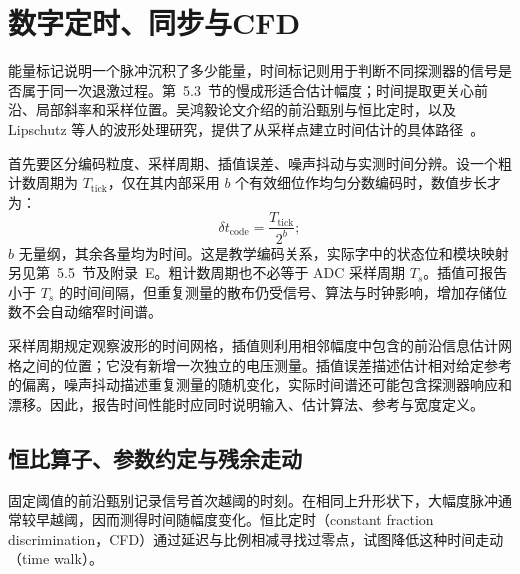 \section{数字定时、同步与CFD}\label{sec:5-4}

能量标记说明一个脉冲沉积了多少能量，时间标记则用于判断不同探测器的信号是否属于同一次退激过程。第~5.3~节的慢成形适合估计幅度；时间提取更关心前沿、局部斜率和采样位置。吴鸿毅论文介绍的前沿甄别与恒比定时，以及 Lipschutz 等人的波形处理研究，提供了从采样点建立时间估计的具体路径~\cite{wu-hongyi-2020-general-purpose-digital-daq-thesis, doctoral-r1-g32-lipschutz-2016-pixie16-ddas-timing}。

首先要区分编码粒度、采样周期、插值误差、噪声抖动与实测时间分辨。设一个粗计数周期为 $T_{\mathrm{tick}}$，仅在其内部采用 $b$ 个有效细位作均匀分数编码时，数值步长才为：
\begin{equation}\label{eq:5-4-code-step}
\delta t_{\mathrm{code}} = \frac{T_{\mathrm{tick}}}{2^b};
\end{equation}
$b$ 无量纲，其余各量均为时间。这是教学编码关系，实际字中的状态位和模块映射另见第~5.5~节及附录~E。粗计数周期也不必等于 ADC 采样周期 $T_s$。插值可报告小于 $T_s$ 的时间间隔，但重复测量的散布仍受信号、算法与时钟影响，增加存储位数不会自动缩窄时间谱。

采样周期规定观察波形的时间网格，插值则利用相邻幅度中包含的前沿信息估计网格之间的位置；它没有新增一次独立的电压测量。插值误差描述估计相对给定参考的偏离，噪声抖动描述重复测量的随机变化，实际时间谱还可能包含探测器响应和漂移。因此，报告时间性能时应同时说明输入、估计算法、参考与宽度定义。

\subsection{恒比算子、参数约定与残余走动}\label{subsec:5-4-1}

固定阈值的前沿甄别记录信号首次越阈的时刻。在相同上升形状下，大幅度脉冲通常较早越阈，因而测得时间随幅度变化。恒比定时（constant fraction discrimination，CFD）通过延迟与比例相减寻找过零点，试图降低这种时间走动（time walk）。

